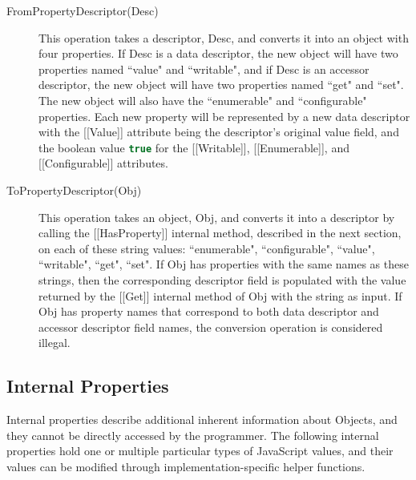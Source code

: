 \documentclass[a4paper,11pt,twoside]{report}
\def\jsinline{\lstinline[language=JavaScript, basicstyle=\small]}%\end{lstlisting}
\begin{document}
\begin{description}
\item[FromPropertyDescriptor(Desc)] This operation takes a descriptor, Desc, and converts it into an object with four properties. If Desc is a data descriptor, the new object will have two properties named ``value" and ``writable", and if Desc is an accessor descriptor, the new object will have two properties named ``get" and ``set". The new object will also have the ``enumerable" and ``configurable" properties. Each new property will be represented by a new data descriptor with the [[Value]] attribute being the descriptor's original value field, and the boolean value \jsinline|true| for the [[Writable]], [[Enumerable]], and [[Configurable]] attributes.

\item[ToPropertyDescriptor(Obj)] This operation takes an object, Obj, and converts it into a descriptor by calling the [[HasProperty]] internal method, described in the next section, on each of these string values: ``enumerable", ``configurable", ``value", ``writable", ``get", ``set". If Obj has properties with the same names as these strings, then the corresponding descriptor field is populated with the value returned by the [[Get]] internal method of Obj with the string as input. If Obj has property names that correspond to both data descriptor and accessor descriptor field names, the conversion operation is considered illegal.
\end{description}

\subsection{Internal Properties}
Internal properties describe additional inherent information about Objects, and they cannot be directly accessed by the programmer. The following internal properties hold one or multiple particular types of JavaScript values, and their values can be modified through implementation-specific helper functions.
\end{document}
